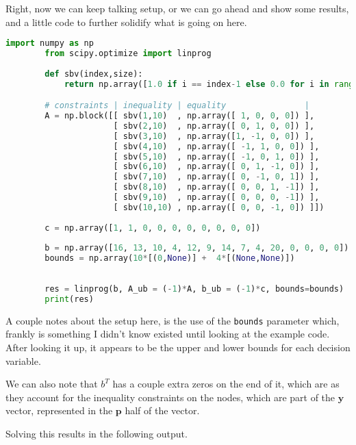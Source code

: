\documentclass[11pt]{article}
\begin{document}
    Right, now we can keep talking setup, or we can go ahead and show some
    results, and a little code to further solidify what is going on here.

    \begin{lstlisting}[style=mystyle, language=Python, gobble=8, 
                      caption=The dual linear program]
        import numpy as np
        from scipy.optimize import linprog
        
        def sbv(index,size):
            return np.array([1.0 if i == index-1 else 0.0 for i in range(size)])

        # constraints | inequality | equality                |
        A = np.block([[ sbv(1,10)  , np.array([ 1, 0, 0, 0]) ],
                      [ sbv(2,10)  , np.array([ 0, 1, 0, 0]) ],
                      [ sbv(3,10)  , np.array([1, -1, 0, 0]) ],
                      [ sbv(4,10)  , np.array([ -1, 1, 0, 0]) ],
                      [ sbv(5,10)  , np.array([ -1, 0, 1, 0]) ],
                      [ sbv(6,10)  , np.array([ 0, 1, -1, 0]) ],
                      [ sbv(7,10)  , np.array([ 0, -1, 0, 1]) ],
                      [ sbv(8,10)  , np.array([ 0, 0, 1, -1]) ],
                      [ sbv(9,10)  , np.array([ 0, 0, 0, -1]) ],
                      [ sbv(10,10) , np.array([ 0, 0, -1, 0]) ]])
        
        c = np.array([1, 1, 0, 0, 0, 0, 0, 0, 0, 0])
        
        b = np.array([16, 13, 10, 4, 12, 9, 14, 7, 4, 20, 0, 0, 0, 0])
        bounds = np.array(10*[(0,None)] +  4*[(None,None)])
        
        
        res = linprog(b, A_ub = (-1)*A, b_ub = (-1)*c, bounds=bounds)
        print(res)
    \end{lstlisting}

    A couple notes about the setup here, is the use of the \texttt{bounds}
    parameter which, frankly is something I didn't know existed until looking
    at the example code. After looking it up, it appears to be the upper and
    lower bounds for each decision variable. 
    
    We can also note that $b^T$ has a couple extra zeros on the end of it,
    which are as they account for the inequality constraints on the nodes,
    which are part of the $\textbf{y}$ vector, represented in the $\textbf{p}$
    half of the vector. 

    Solving this results in the following output.
\end{document}
